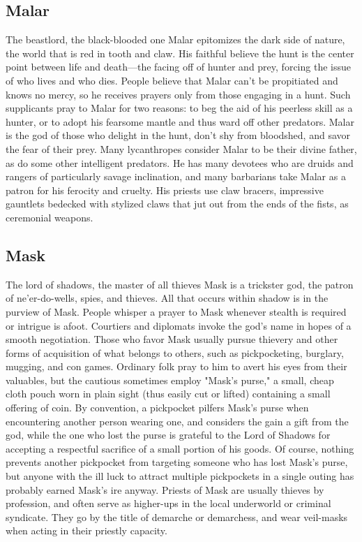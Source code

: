 \documentclass[10pt,a4paper,twoside,twocolumn,openany,bg=print,nodeprecatedcode]{dndbook}
\begin{document}
\subsection{Malar}
The beastlord, the black-blooded one
Malar epitomizes the dark side of nature, the world that is red in tooth and claw. His faithful believe the hunt is the center point between life and death—the facing off of hunter and prey, forcing the issue of who lives and who dies. People believe that Malar can't be propitiated and knows no mercy, so he receives prayers only from those engaging in a hunt. Such supplicants pray to Malar for two reasons: to beg the aid of his peerless skill as a hunter, or to adopt his fearsome mantle and thus ward off other predators. Malar is the god of those who delight in the hunt, don't shy from bloodshed, and savor the fear of their prey.
Many lycanthropes consider Malar to be their divine father, as do some other intelligent predators. He has many devotees who are druids and rangers of particularly savage inclination, and many barbarians take Malar as a patron for his ferocity and cruelty. His priests use claw bracers, impressive gauntlets bedecked with stylized claws that jut out from the ends of the fists, as ceremonial weapons.
\subsection{Mask}
The lord of shadows, the master of all thieves
Mask is a trickster god, the patron of ne'er-do-wells, spies, and thieves. All that occurs within shadow is in the purview of Mask. People whisper a prayer to Mask whenever stealth is required or intrigue is afoot. Courtiers and diplomats invoke the god's name in hopes of a smooth negotiation.
Those who favor Mask usually pursue thievery and other forms of acquisition of what belongs to others, such as pickpocketing, burglary, mugging, and con games. Ordinary folk pray to him to avert his eyes from their valuables, but the cautious sometimes employ "Mask's purse," a small, cheap cloth pouch worn in plain sight (thus easily cut or lifted) containing a small offering of coin. By convention, a pickpocket pilfers Mask's purse when encountering another person wearing one, and considers the gain a gift from the god, while the one who lost the purse is grateful to the Lord of Shadows for accepting a respectful sacrifice of a small portion of his goods. Of course, nothing prevents another pickpocket from targeting someone who has lost Mask's purse, but anyone with the ill luck to attract multiple pickpockets in a single outing has probably earned Mask's ire anyway.
Priests of Mask are usually thieves by profession, and often serve as higher-ups in the local underworld or criminal syndicate. They go by the title of demarche or demarchess, and wear veil-masks when acting in their priestly capacity.
\end{document}
